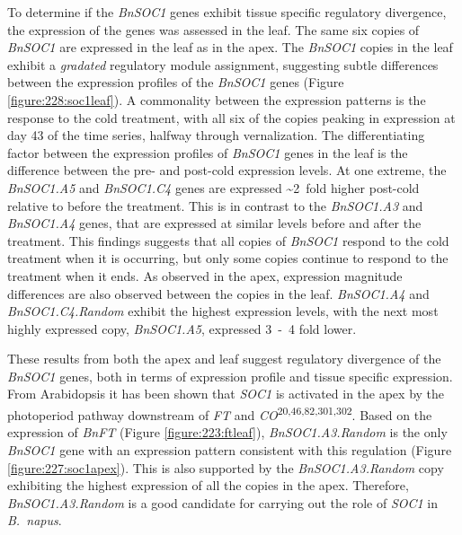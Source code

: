 \documentclass[12pt,]{book}
\begin{document}
To determine if the \emph{BnSOC1} genes exhibit tissue specific
regulatory divergence, the expression of the genes was assessed in the
leaf. The same six copies of \emph{BnSOC1} are expressed in the leaf as
in the apex. The \emph{BnSOC1} copies in the leaf exhibit a
\emph{gradated} regulatory module assignment, suggesting subtle
differences between the expression profiles of the \emph{BnSOC1} genes
(Figure \ref{figure:228:soc1leaf}). A commonality between the expression
patterns is the response to the cold treatment, with all six of the
copies peaking in expression at day 43 of the time series, halfway
through vernalization. The differentiating factor between the expression
profiles of \emph{BnSOC1} genes in the leaf is the difference between
the pre- and post-cold expression levels. At one extreme, the
\emph{BnSOC1.A5} and \emph{BnSOC1.C4} genes are expressed
\textasciitilde{}2~fold higher post-cold relative to before the
treatment. This is in contrast to the \emph{BnSOC1.A3} and
\emph{BnSOC1.A4} genes, that are expressed at similar levels before and
after the treatment. This findings suggests that all copies of
\emph{BnSOC1} respond to the cold treatment when it is occurring, but
only some copies continue to respond to the treatment when it ends. As
observed in the apex, expression magnitude differences are also observed
between the copies in the leaf. \emph{BnSOC1.A4} and
\emph{BnSOC1.C4.Random} exhibit the highest expression levels, with the
next most highly expressed copy, \emph{BnSOC1.A5}, expressed 3~-~4 fold
lower.

These results from both the apex and leaf suggest regulatory divergence
of the \emph{BnSOC1} genes, both in terms of expression profile and
tissue specific expression. From Arabidopsis it has been shown that
\emph{SOC1} is activated in the apex by the photoperiod pathway
downstream of \emph{FT} and \emph{CO}\textsuperscript{20,46,82,301,302}.
Based on the expression of \emph{BnFT} (Figure \ref{figure:223:ftleaf}),
\emph{BnSOC1.A3.Random} is the only \emph{BnSOC1} gene with an
expression pattern consistent with this regulation (Figure
\ref{figure:227:soc1apex}). This is also supported by the
\emph{BnSOC1.A3.Random} copy exhibiting the highest expression of all
the copies in the apex. Therefore, \emph{BnSOC1.A3.Random} is a good
candidate for carrying out the role of \emph{SOC1} in \emph{B.~napus}.
\end{document}
